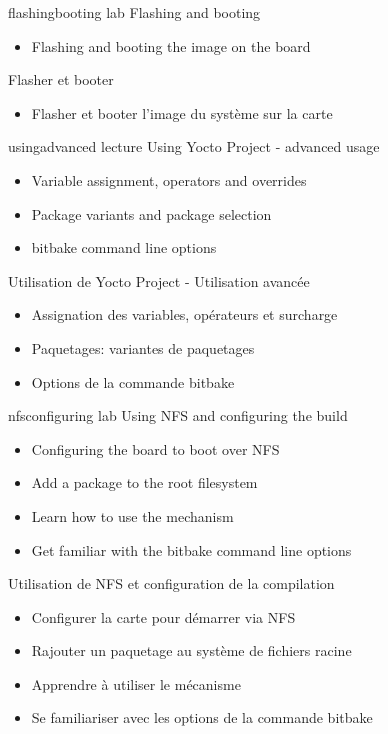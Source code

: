{flashingbooting}
{lab}
{Flashing and booting}
{
  \begin{itemize}
  \item Flashing and booting the image on the board
  \end{itemize}
}
{Flasher et booter}
{
  \begin{itemize}
  \item Flasher et booter l'image du système sur la carte
  \end{itemize}
}

{usingadvanced}
{lecture}
{Using Yocto Project - advanced usage}
{
  \begin{itemize}
  \item Variable assignment, operators and overrides
  \item Package variants and package selection
  \item bitbake command line options
  \end{itemize}
}
{Utilisation de Yocto Project - Utilisation avancée}
{
  \begin{itemize}
  \item Assignation des variables, opérateurs et surcharge
  \item Paquetages: variantes de paquetages
  \item Options de la commande bitbake
  \end{itemize}
}

{nfsconfiguring}
{lab}
{Using NFS and configuring the build}
{
  \begin{itemize}
  \item Configuring the board to boot over NFS
  \item Add a package to the root filesystem
  \item Learn how to use the  mechanism
  \item Get familiar with the bitbake command line options
  \end{itemize}
}
{Utilisation de NFS et configuration de la compilation}
{
  \begin{itemize}
  \item Configurer la carte pour démarrer via NFS
  \item Rajouter un paquetage au système de fichiers racine
  \item Apprendre à utiliser le mécanisme 
  \item Se familiariser avec les options de la commande bitbake
  \end{itemize}
}

